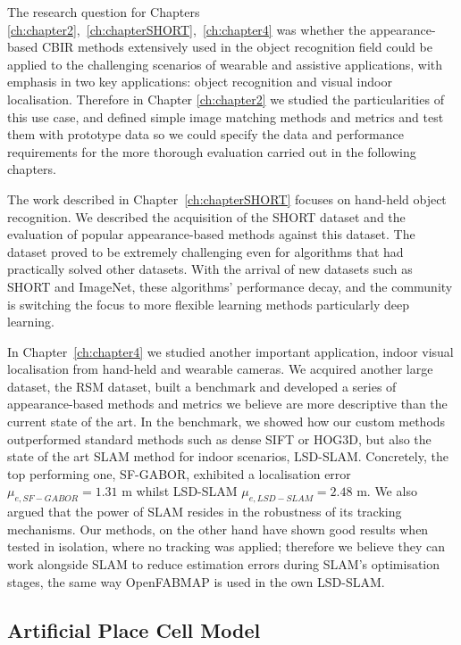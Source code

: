 The research question for Chapters \ref{ch:chapter2},~\ref{ch:chapterSHORT},~\ref{ch:chapter4} was whether the appearance-based CBIR methods extensively used in the object recognition field could be applied to the challenging scenarios of wearable and assistive applications, with emphasis in two key applications: object recognition and visual indoor localisation. Therefore in Chapter \ref{ch:chapter2} we studied the particularities of this use case, and defined simple image matching methods and metrics and test them with prototype data so we could specify the data and performance requirements for the more thorough evaluation carried out in the following chapters.

The work described in Chapter~\ref{ch:chapterSHORT} focuses on hand-held object recognition. We described the acquisition of the SHORT dataset and the evaluation of popular appearance-based methods against this dataset. The dataset proved to be extremely challenging even for algorithms that had practically solved other datasets. With the arrival of new datasets such as SHORT and ImageNet, these algorithms' performance decay, and the community is switching the focus to more flexible learning methods particularly deep learning.

In Chapter~\ref{ch:chapter4} we studied another important application, indoor visual localisation from hand-held and wearable cameras. We acquired another large dataset, the RSM dataset, built a benchmark and developed a series of appearance-based methods and metrics we believe are more descriptive than the current state of the art. In the benchmark, we showed how our custom methods outperformed standard methods such as dense SIFT or HOG3D, but also the state of the art SLAM method for indoor scenarios, LSD-SLAM. Concretely, the top performing one, SF-GABOR, exhibited a localisation error $\mu_{e,SF-GABOR} = 1.31 $ m whilst LSD-SLAM $\mu_{e,LSD-SLAM} = 2.48 $ m.  We also argued that the power of SLAM resides in the robustness of its tracking mechanisms. Our methods, on the other hand have shown good results when tested in isolation, where no tracking was applied; therefore we believe they can work alongside SLAM to reduce estimation errors during SLAM's optimisation stages, the same way OpenFABMAP is used in the own LSD-SLAM.


\subsection{Artificial Place Cell Model}

